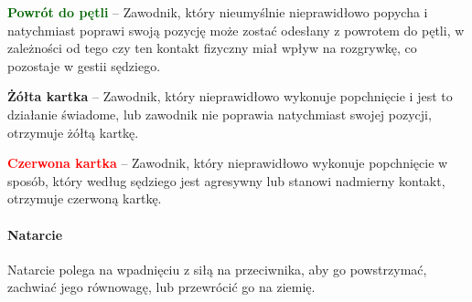 \documentclass[12pt]{article}
\newcommand\redcard[1]{\bgroup\textcolor{red}{\textbf{#1}}}
\newcommand\yellowcard[1]{\bgroup\textcolor{darkyellow}{\textbf{#1}}}
\newcommand\other[1]{\bgroup\textcolor{darkgreen}{\textbf{#1}}}
\begin{document}
\other{Powrót do pętli} -- Zawodnik, który nieumyślnie nieprawidłowo
popycha i natychmiast poprawi swoją pozycję może zostać odesłany z
powrotem do pętli, w zależności od tego czy ten kontakt fizyczny miał
wpływ na rozgrywkę, co pozostaje w gestii sędziego.

\yellowcard{Żółta kartka} -- Zawodnik, który nieprawidłowo wykonuje popchnięcie
i jest to działanie świadome, lub zawodnik nie poprawia natychmiast
swojej pozycji, otrzymuje żółtą kartkę.

\redcard{Czerwona kartka} -- Zawodnik, który nieprawidłowo wykonuje
popchnięcie w sposób, który według sędziego jest agresywny lub stanowi
nadmierny kontakt, otrzymuje czerwoną kartkę.

\paragraph{Natarcie}
Natarcie polega na wpadnięciu z siłą na
przeciwnika, aby go powstrzymać, zachwiać jego równowagę, lub przewrócić
go na ziemię.
\end{document}
